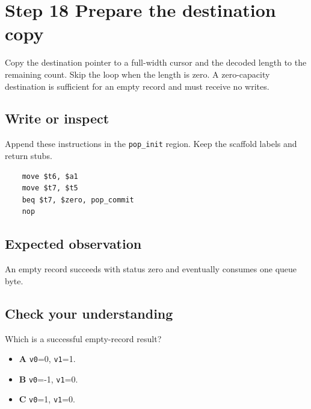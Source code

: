 \section{Step 18 Prepare the destination copy}\label{ring-s18}

Copy the destination pointer to a full-width cursor and the decoded length to the remaining count. Skip the loop when the length is zero. A zero-capacity destination is sufficient for an empty record and must receive no writes.

\subsection{Write or inspect}
Append these instructions in the \texttt{pop\_init} region. Keep the scaffold labels and return stubs.

\begin{verbatim}
    move $t6, $a1
    move $t7, $t5
    beq $t7, $zero, pop_commit
    nop
\end{verbatim}

\subsection{Expected observation}
An empty record succeeds with status zero and eventually consumes one queue byte.

\subsection{Check your understanding}
Which is a successful empty-record result?

\begin{itemize}
  \item \textbf{A} \texttt{v0}=0, \texttt{v1}=1.
  \item \textbf{B} \texttt{v0}=-1, \texttt{v1}=0.
  \item \textbf{C} \texttt{v0}=1, \texttt{v1}=0.
\end{itemize}
